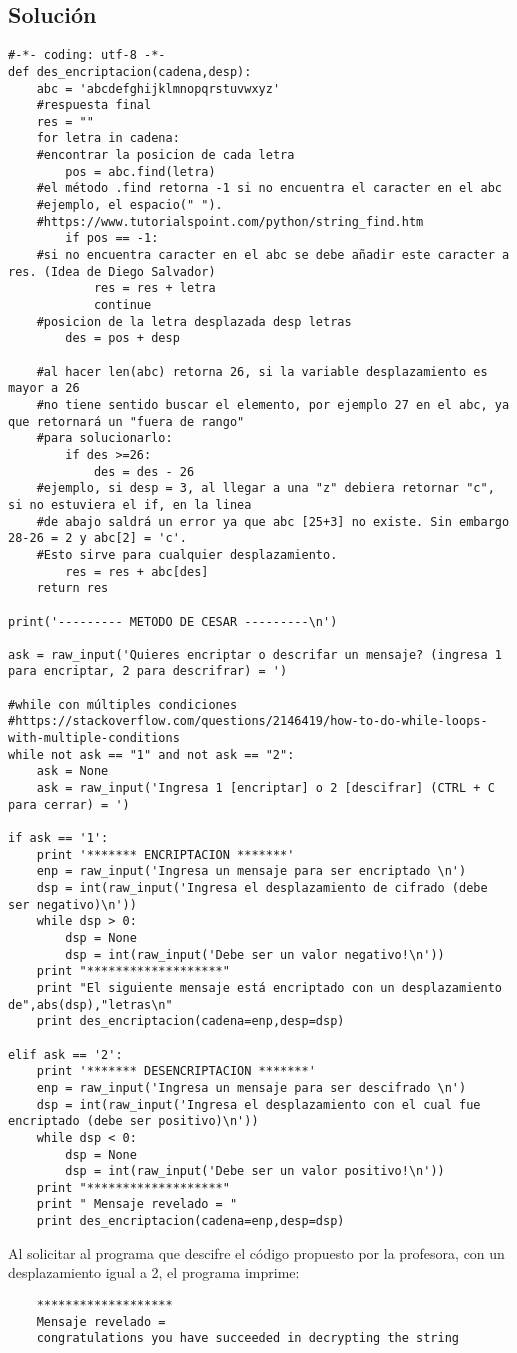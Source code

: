 \documentclass[a4paper,10pt]{article}
\begin{document}
\subsection*{Solución}
\begin{verbatim}
#-*- coding: utf-8 -*-
def des_encriptacion(cadena,desp):
	abc = 'abcdefghijklmnopqrstuvwxyz'
	#respuesta final 
	res = ""
	for letra in cadena:
	#encontrar la posicion de cada letra 
		pos = abc.find(letra)
	#el método .find retorna -1 si no encuentra el caracter en el abc
	#ejemplo, el espacio(" ").
	#https://www.tutorialspoint.com/python/string_find.htm
		if pos == -1:
	#si no encuentra caracter en el abc se debe añadir este caracter a res. (Idea de Diego Salvador)
			res = res + letra
			continue
	#posicion de la letra desplazada desp letras
		des = pos + desp

	#al hacer len(abc) retorna 26, si la variable desplazamiento es mayor a 26
	#no tiene sentido buscar el elemento, por ejemplo 27 en el abc, ya que retornará un "fuera de rango"
	#para solucionarlo: 
		if des >=26:
			des = des - 26
	#ejemplo, si desp = 3, al llegar a una "z" debiera retornar "c", si no estuviera el if, en la linea
	#de abajo saldrá un error ya que abc [25+3] no existe. Sin embargo 28-26 = 2 y abc[2] = 'c'. 
	#Esto sirve para cualquier desplazamiento.
		res = res + abc[des]
	return res

print('--------- METODO DE CESAR ---------\n')

ask = raw_input('Quieres encriptar o descrifar un mensaje? (ingresa 1 para encriptar, 2 para descrifrar) = ')

#while con múltiples condiciones
#https://stackoverflow.com/questions/2146419/how-to-do-while-loops-with-multiple-conditions
while not ask == "1" and not ask == "2":
	ask = None
	ask = raw_input('Ingresa 1 [encriptar] o 2 [descifrar] (CTRL + C para cerrar) = ')

if ask == '1':
	print '******* ENCRIPTACION *******'
	enp = raw_input('Ingresa un mensaje para ser encriptado \n')
	dsp = int(raw_input('Ingresa el desplazamiento de cifrado (debe ser negativo)\n'))
	while dsp > 0: 
		dsp = None
		dsp = int(raw_input('Debe ser un valor negativo!\n'))
	print "*******************"
	print "El siguiente mensaje está encriptado con un desplazamiento de",abs(dsp),"letras\n"
	print des_encriptacion(cadena=enp,desp=dsp)

elif ask == '2':
	print '******* DESENCRIPTACION *******'
	enp = raw_input('Ingresa un mensaje para ser descifrado \n')
	dsp = int(raw_input('Ingresa el desplazamiento con el cual fue encriptado (debe ser positivo)\n'))
	while dsp < 0: 
		dsp = None
		dsp = int(raw_input('Debe ser un valor positivo!\n'))
	print "*******************"
	print " Mensaje revelado = "
	print des_encriptacion(cadena=enp,desp=dsp)
\end{verbatim}
Al solicitar al programa que descifre el código propuesto por la profesora, con un desplazamiento igual a 2, el programa imprime: 
\begin{verbatim}
    *******************
    Mensaje revelado = 
    congratulations you have succeeded in decrypting the string
\end{verbatim}
\newpage
\end{document}
